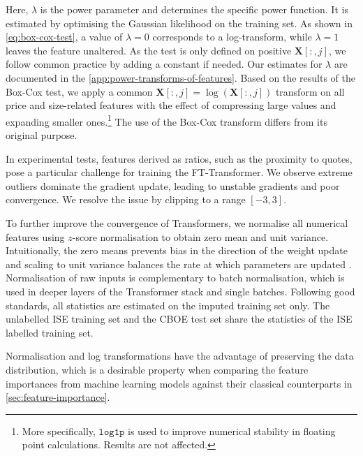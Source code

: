 Here, $\lambda$ is the power parameter and determines the specific power function. It is estimated by optimising the Gaussian likelihood on the training set. As shown in \cref{eq:box-cox-test}, a value of $\lambda=0$ corresponds to a log-transform, while $\lambda=1$ leaves the feature unaltered. As the test is only defined on positive $\mathbf{X}\left[:,j\right]$, we follow common practice by adding a constant if needed. Our estimates for $\lambda$ are documented in the \cref{app:power-transforms-of-features}. Based on the results of the Box-Cox test, we apply a common $\mathbf{X}\left[:,j\right]=\log(\mathbf{X}\left[:,j\right])$ transform on all price and size-related features with the effect of compressing large values and expanding smaller ones.\footnote{More specifically, $\mathtt{log1p}$ is used to improve numerical stability in floating point calculations. Results are not affected.} The use of the Box-Cox transform differs from its original purpose. 

In experimental tests, features derived as ratios, such as the proximity to quotes, pose a particular challenge for training the FT-Transformer. We observe extreme outliers dominate the gradient update, leading to unstable gradients and poor convergence. We resolve the issue by clipping to a range $[-3,3]$.

To further improve the convergence of Transformers, we normalise all numerical features using $z$-score normalisation to obtain zero mean and unit variance. Intuitionally, the zero means prevents bias in the direction of the weight update and scaling to unit variance balances the rate at which parameters are updated \autocite[][8]{lecunEfficientBackProp2012}. Normalisation of raw inputs is complementary to batch normalisation, which is used in deeper layers of the Transformer stack and single batches. Following good standards, all statistics are estimated on the imputed training set only. The unlabelled \gls{ISE} training set and the \gls{CBOE} test set share the statistics of the \gls{ISE} labelled training set.

Normalisation and log transformations have the advantage of preserving the data distribution, which is a desirable property when comparing the feature importances from machine learning models against their classical counterparts in \cref{sec:feature-importance}.


